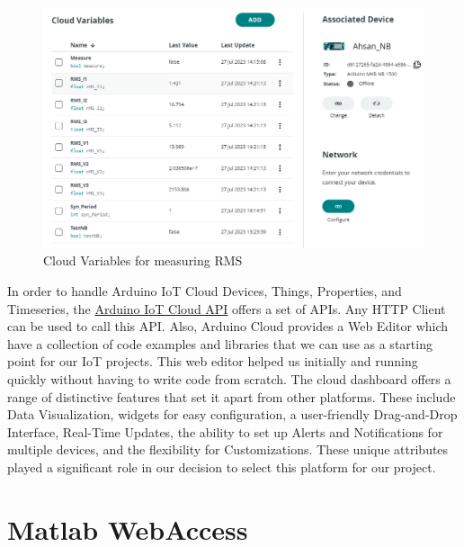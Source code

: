\begin{figure}[htbp]
\centering
\includegraphics[scale=0.55]{images/Cloud Variables.PNG}
\caption{Cloud Variables for measuring RMS}
\label{fig:x Cloud Variables}
\end{figure}
In order to handle Arduino IoT Cloud Devices, Things, Properties, and Timeseries, the \href{https://www.arduino.cc/reference/en/iot/api/}{Arduino IoT Cloud API} offers a set of APIs. Any HTTP Client can be used to call this API. Also, Arduino Cloud provides a Web Editor which have a collection of code examples and libraries that we can use as a starting point for our IoT projects. This web editor helped us initially and running quickly without having to write code from scratch. The cloud dashboard offers a range of distinctive features that set it apart from other platforms. These include Data Visualization, widgets for easy configuration, a user-friendly Drag-and-Drop Interface, Real-Time Updates, the ability to set up Alerts and Notifications for multiple devices, and the flexibility for Customizations. These unique attributes played a significant role in our decision to select this platform for our project.

\section{Matlab WebAccess} 
